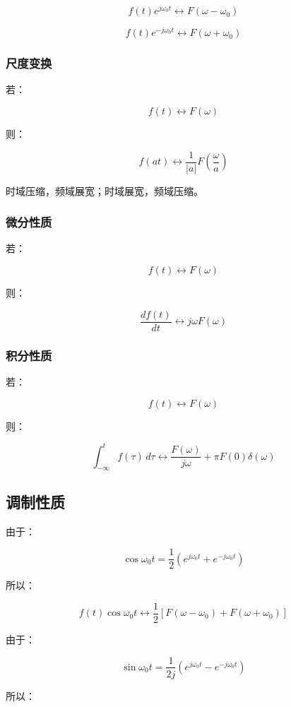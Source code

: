 \documentclass[UTF8]{ctexart}
\begin{document}
\[
f(t)e^{j\omega_0 t}\leftrightarrow F(\omega-\omega_0)
\]

\[
f(t)e^{-j\omega_0 t}\leftrightarrow F(\omega+\omega_0)
\]

\subsubsection{尺度变换}

若：

\[
f(t)\leftrightarrow F(\omega)
\]

则：

\[
f(at)\leftrightarrow \frac{1}{|a|}F\left(\frac{\omega}{a}\right)
\]

时域压缩，频域展宽；时域展宽，频域压缩。

\subsubsection{微分性质}

若：

\[
f(t)\leftrightarrow F(\omega)
\]

则：

\[
\frac{d f(t)}{dt}\leftrightarrow j\omega F(\omega)
\]

\subsubsection{积分性质}

若：

\[
f(t)\leftrightarrow F(\omega)
\]

则：

\[
\int_{-\infty}^{t}f(\tau)\,d\tau
\leftrightarrow
\frac{F(\omega)}{j\omega}+\pi F(0)\delta(\omega)
\]

\subsection{调制性质}

由于：

\[
\cos \omega_0 t=\frac{1}{2}\left(e^{j\omega_0 t}+e^{-j\omega_0 t}\right)
\]

所以：

\[
f(t)\cos \omega_0 t
\leftrightarrow
\frac{1}{2}\left[F(\omega-\omega_0)+F(\omega+\omega_0)\right]
\]

由于：

\[
\sin \omega_0 t=\frac{1}{2j}\left(e^{j\omega_0 t}-e^{-j\omega_0 t}\right)
\]

所以：
\end{document}
